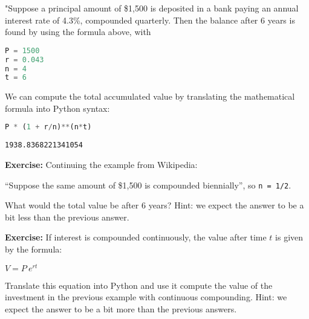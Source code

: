 "Suppose a principal amount of \$1,500 is deposited in a bank paying an
annual interest rate of 4.3\%, compounded quarterly. Then the balance
after 6 years is found by using the formula above, with

\begin{lstlisting}[language=Python,style=source]
P = 1500
r = 0.043
n = 4
t = 6
\end{lstlisting}

We can compute the total accumulated value by translating the
mathematical formula into Python syntax:

\begin{lstlisting}[language=Python,style=source]
P * (1 + r/n)**(n*t)
\end{lstlisting}

\begin{lstlisting}[style=output]
1938.8368221341054
\end{lstlisting}

\textbf{Exercise:} Continuing the example from Wikipedia:

``Suppose the same amount of \$1,500 is compounded biennially'', so
\passthrough{\lstinline!n = 1/2!}.

What would the total value be after 6 years? Hint: we expect the answer
to be a bit less than the previous answer.

\textbf{Exercise:} If interest is compounded continuously, the value
after time \(t\) is given by the formula:

\(V=P~e^{rt}\)

Translate this equation into Python and use it compute the value of the
investment in the previous example with continuous compounding. Hint: we
expect the answer to be a bit more than the previous answers.

